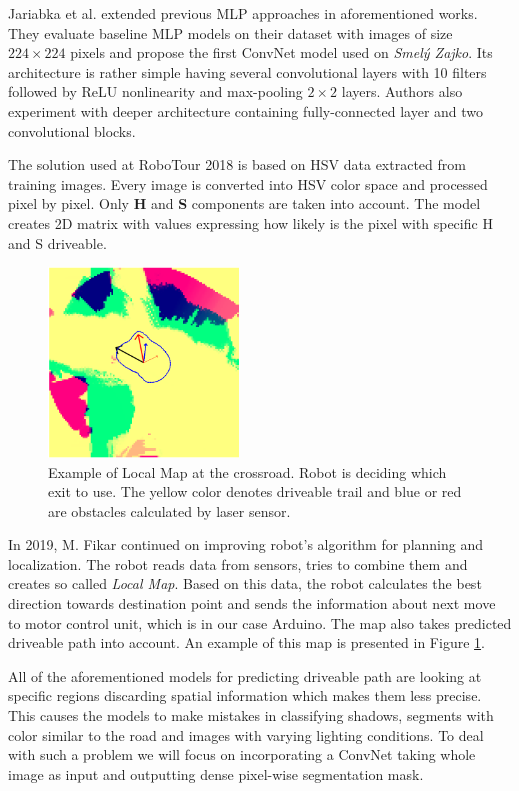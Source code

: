 Jariabka et al. \cite{bib:suppajariabka2017} extended previous MLP approaches in
aforementioned works. They evaluate baseline MLP models on their dataset with images
of size $224\times 224$ pixels and propose the first ConvNet model used on
\textit{Smelý Zajko}. Its architecture is rather simple having several convolutional layers
with 10 filters followed by ReLU nonlinearity and max-pooling $2\times 2$ layers. Authors
also experiment with deeper architecture containing fully-connected layer and two
convolutional blocks.

The solution used at RoboTour 2018 is based on HSV data extracted from training images.
Every image is converted into HSV color space and processed pixel by pixel. Only
\textbf{H} and \textbf{S} components are taken into account. The model creates 2D
matrix with values expressing how likely is the pixel with specific H and S driveable.

\begin{figure}[!h]
	\centerline{\includegraphics[width=0.45\textwidth]{images/localmap.png}}
	\caption[Example of Local Map at the crossroad]{Example of Local Map at the crossroad.
	Robot is deciding which exit to use. The yellow color denotes driveable trail and blue or red are obstacles calculated by laser sensor.}
	\label{img:localmap}
\end{figure}

In 2019, M. Fikar \cite{bib:fikar2019} continued on improving robot's algorithm for planning and
localization. The robot reads data from sensors, tries to combine them and creates so called
\textit{Local Map}. Based on this data, the robot calculates the best direction towards
destination point and sends the information about next move to motor control unit, which is in
our case Arduino. The map also takes predicted driveable path into account.
An example of this map is presented in Figure \ref{img:localmap}.

\vspace{5mm}
All of the aforementioned models for predicting driveable path
are looking at specific regions discarding spatial information which makes them
less precise. This causes the models to make mistakes in classifying shadows, segments
with color similar to the road and images with varying lighting conditions.
To deal with such a problem we will focus on incorporating a ConvNet taking whole image as
input and outputting dense pixel-wise segmentation mask.